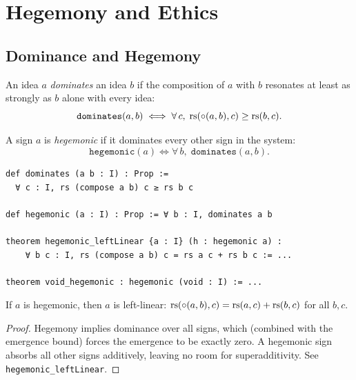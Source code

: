 \section{Hegemony and Ethics}

\subsection{Dominance and Hegemony}

\begin{definition}[Dominance]
\label{def:dominates}
An idea $a$ \emph{dominates} an idea $b$ if the composition of $a$
with $b$ resonates at least as strongly as $b$ alone with every idea:
\[
  \texttt{dominates}(a, b) \iff \forall\, c,\;
  \mathrm{rs}(\circ(a, b), c) \geq \mathrm{rs}(b, c).
\]
\end{definition}

\begin{definition}
\label{def:hegemonic}
A sign $a$ is \emph{hegemonic} if it dominates every other sign in
the system:
\[
  \texttt{hegemonic}(a) \iff \forall\, b,\;
  \texttt{dominates}(a, b).
\]
\end{definition}

\begin{lstlisting}[caption={Hegemony: domination across the semiosphere}]
def dominates (a b : I) : Prop :=
  ∀ c : I, rs (compose a b) c ≥ rs b c

def hegemonic (a : I) : Prop := ∀ b : I, dominates a b

theorem hegemonic_leftLinear {a : I} (h : hegemonic a) :
    ∀ b c : I, rs (compose a b) c = rs a c + rs b c := ...

theorem void_hegemonic : hegemonic (void : I) := ...
\end{lstlisting}

\begin{theorem}
\label{thm:hegemonic-leftlinear}
If $a$ is hegemonic, then $a$ is left-linear:
$\mathrm{rs}(\circ(a, b), c) = \mathrm{rs}(a, c) + \mathrm{rs}(b, c)$ for all $b, c$.
\end{theorem}

\begin{proof}
Hegemony implies dominance over all signs, which (combined with the
emergence bound) forces the emergence to be exactly zero. A hegemonic
sign absorbs all other signs additively, leaving no room for
superadditivity. See \texttt{hegemonic\_leftLinear}.
\end{proof}

